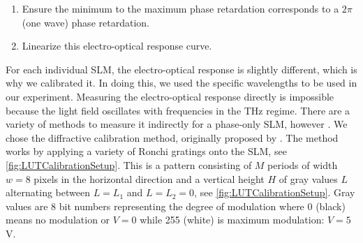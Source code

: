 \begin{enumerate}
    \itemsep=0pt
    
    \item Ensure the minimum to the maximum phase retardation corresponds to a $2\pi$ (one wave) phase retardation.
    
    \item Linearize this electro-optical response curve. 
\end{enumerate}
For each individual SLM, the electro-optical response is slightly different, which is why we calibrated it.
In doing this, we used the specific wavelengths to be used in our experiment.
Measuring the electro-optical response directly is impossible because the light field oscillates with frequencies in the THz regime.
There are a variety of methods to measure it indirectly for a phase-only \ac{SLM}, however \cite{Li2019}.
We chose the diffractive calibration method, originally proposed by \cite{Zhang1994}.
The method works by applying a variety of Ronchi gratings onto the SLM, see \cref{fig:LUTCalibrationSetup}.
This is a pattern consisting of $M$ periods of width $w=8$ pixels in the horizontal direction and a vertical height $H$ of gray values $L$ alternating between $L=L_1$ and $L=L_2=0$, see \cref{fig:LUTCalibrationSetup}.
Gray values are 8 bit numbers representing the degree of modulation where 0 (black) means no modulation or $V=0$ while 255 (white) is maximum modulation: $V=5$V. 

